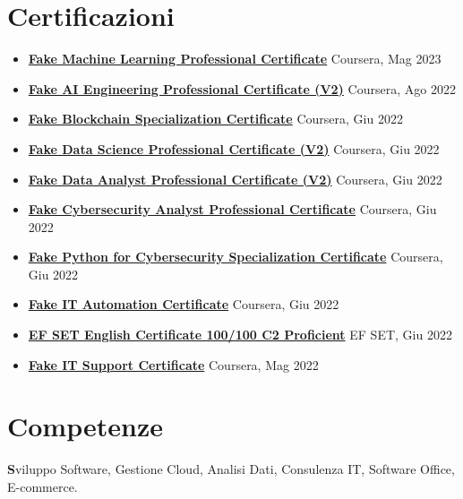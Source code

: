 \documentclass[a4paper,12pt]{article}
\begin{document}
\section{Certificazioni}
\begin{itemize}[leftmargin=*,itemsep=3pt,parsep=0pt]
\item \textbf{\href{https://www.credly.com/badges/fake-badge-1/linked_in_profile}{Fake Machine Learning Professional Certificate}} \hfill \textnormal{Coursera, Mag 2023}
\item \textbf{\href{https://www.credly.com/badges/fake-badge-2/linked_in_profile}{Fake AI Engineering Professional Certificate (V2)}} \hfill \textnormal{Coursera, Ago 2022}
\item \textbf{\href{https://www.coursera.org/account/accomplishments/specialization/certificate/FAKE_CERT_1}{Fake Blockchain Specialization Certificate}} \hfill \textnormal{Coursera, Giu 2022}
\item \textbf{\href{https://www.credly.com/badges/fake-badge-3/linked_in_profile}{Fake Data Science Professional Certificate (V2)}} \hfill \textnormal{Coursera, Giu 2022}
\item \textbf{\href{https://www.credly.com/badges/fake-badge-4/linked_in_profile}{Fake Data Analyst Professional Certificate (V2)}} \hfill \textnormal{Coursera, Giu 2022}
\item \textbf{\href{https://www.credly.com/badges/fake-badge-5/linked_in_profile}{Fake Cybersecurity Analyst Professional Certificate}} \hfill \textnormal{Coursera, Giu 2022}
\item \textbf{\href{https://www.coursera.org/account/accomplishments/specialization/certificate/FAKE_CERT_2}{Fake Python for Cybersecurity Specialization Certificate}} \hfill \textnormal{Coursera, Giu 2022}
\item \textbf{\href{https://www.credly.com/badges/fake-badge-6/linked_in_profile}{Fake IT Automation Certificate}} \hfill \textnormal{Coursera, Giu 2022}
\item \textbf{\href{https://www.efset.org/cert/FAKE_EFSET}{EF SET English Certificate 100/100 C2 Proficient}} \hfill \textnormal{EF SET, Giu 2022}
\item \textbf{\href{https://www.udemy.com/certificate/UC-FAKE_UDEMY_CERT/}{Fake IT Support Certificate}} \hfill \textnormal{Coursera, Mag 2022}

\end{itemize}

\section{Competenze}
\noindent\textbf Sviluppo Software, Gestione Cloud, Analisi Dati, Consulenza IT, Software Office, E-commerce.
\end{document}
